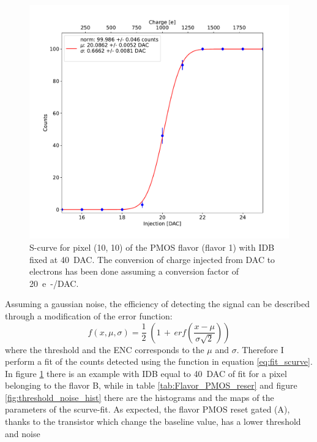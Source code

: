         \begin{figure}[h!]
            \centering
            \includegraphics[width=.6\linewidth]{figures/charaterization/scurve.pdf}
            \caption{S-curve for pixel (10, 10) of the PMOS flavor (flavor 1) with IDB fixed at \SI{40}{DAC}. The conversion of charge injected from DAC to electrons has been done assuming a conversion factor of \SI{20}{e-/DAC}. }
            \label{fig:scurve}
        \end{figure}   
        Assuming a gaussian noise, the efficiency of detecting the signal can be described through a modification of the error function:
        \begin{equation}
            f(x, \mu, \sigma) = \frac{1}{2} \; \left(1\,+\,erf\left(\frac{x-\mu}{\sigma \sqrt{2}}\right)\right)
            \label{eq:fit_scurve}
        \end{equation}
        where the threshold and the ENC corresponds to the $\mu$ and $\sigma$.
        Therefore I perform a fit of the counts detected using the function in equation \ref{eq:fit_scurve}. In figure \ref{fig:scurve} there is an example with IDB equal to \SI{40}{DAC} of fit for a pixel belonging to the flavor B, while in table \ref{tab:Flavor_PMOS_reser} and figure \ref{fig:threshold_noise_hist} there are the histograms and the maps of the parameters of the scurve-fit. As expected, the flavor PMOS reset gated (A), thanks to the transistor which change the baseline value, has a lower threshold and noise
